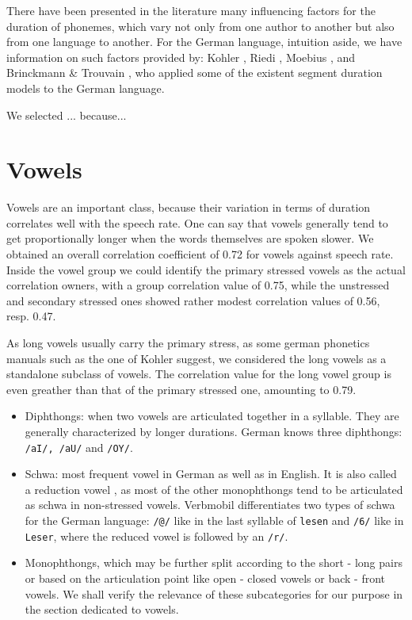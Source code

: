 \documentclass[a4paper]{scrreprt}
\begin{document}
There have been presented in the literature many influencing factors for the duration of phonemes, which vary not only from one author to another but also from one language to another. For the German language, intuition aside, we have information on such factors provided by: Kohler \cite{Kohler1992}, Riedi \cite{Riedi1995}, Moebius \cite{Moebius1996}, and Brinckmann \& Trouvain \cite{Brinckmann_2003}, who applied some of the existent segment duration models to the German language.

We selected ... because...

\section{Vowels}
Vowels are an important class, because their variation in terms of duration correlates well with the speech rate. One can say that vowels generally tend to get proportionally longer when the words themselves are spoken slower. We obtained an overall correlation coefficient of 0.72 for vowels against speech rate. Inside the vowel group we could identify the primary stressed vowels as the actual correlation owners, with a group correlation value of 0.75, while the unstressed and secondary stressed ones showed rather modest correlation values of 0.56, resp. 0.47. 

As long vowels usually carry the primary stress, as some german phonetics manuals such as the one of Kohler \cite{Kohler1995} suggest, we considered the long vowels as a standalone subclass of vowels. The correlation value for the long vowel group is even greather than that of the primary stressed one, amounting to 0.79.

\begin{itemize}
	\item Diphthongs: when two vowels are articulated together in a syllable. They are generally characterized by longer durations. German knows three diphthongs: \texttt{/aI/, /aU/} and \texttt{/OY/}.
	\item Schwa: most frequent vowel in German as well as in English. It is also called a reduction vowel \cite{Kohler1995}, as most of the other monophthongs tend to be articulated as schwa in non-stressed vowels. Verbmobil differentiates two types of schwa for the German language: \texttt{/@/} like in the last syllable of \texttt{lesen} and \texttt{/6/} like in \texttt{Leser}, where the reduced vowel is followed by an \texttt{/r/}.
	\item Monophthongs, which may be further split according to the short - long pairs or based on the articulation point like open - closed vowels or back - front vowels. We shall verify the relevance of these subcategories for our purpose in the section dedicated to vowels.
\end{itemize}
\end{document}
